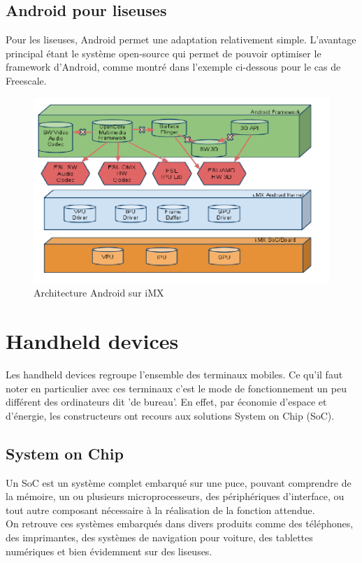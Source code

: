 \subsection{Android pour liseuses}
Pour les liseuses, Android permet une adaptation relativement simple. L'avantage principal étant le système open-source qui permet de pouvoir optimiser le framework d'Android, comme montré dans l'exemple ci-dessous pour le cas de Freescale.\\

\begin{figure}[h!]
\begin{center}
	\includegraphics[scale=0.45]{Android.png}
	\caption{Architecture Android sur iMX}
\end{center}
\end{figure}



\newpage

\section{Handheld devices}
Les handheld devices regroupe l'ensemble des terminaux mobiles. Ce qu'il faut noter en particulier avec ces terminaux c'est le mode de fonctionnement un peu différent des ordinateurs dit 'de bureau'. En effet, par économie d'espace et d'énergie, les constructeurs ont recours aux solutions System on Chip (SoC).

\subsection{System on Chip}
Un SoC est un système complet embarqué sur une puce, pouvant comprendre de la mémoire, un ou plusieurs microprocesseurs, des périphériques d'interface, ou tout autre composant nécessaire à la réalisation de la fonction attendue.
\\On retrouve ces systèmes embarqués dans divers produits comme des téléphones, des imprimantes, des systèmes de navigation pour voiture, des tablettes numériques et bien évidemment sur des liseuses.